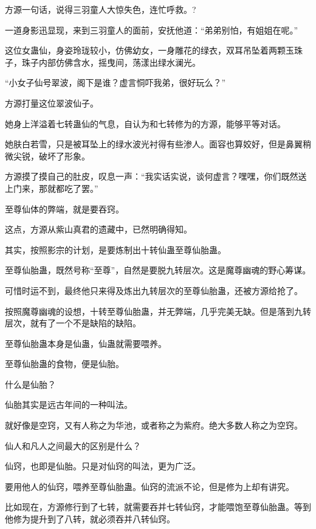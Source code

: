 
\begin{this_body}

方源一句话，说得三羽童人大惊失色，连忙呼救。?

一道身影迅显现，来到三羽童人的面前，安抚他道：“弟弟别怕，有姐姐在呢。”

这位女蛊仙，身姿玲珑较小，仿佛幼女，一身雕花的绿衣，双耳吊坠着两颗玉珠子，珠子内部仿佛含水，摇曳间，荡漾出绿水澜光。

“小女子仙号翠波，阁下是谁？虚言恫吓我弟，很好玩么？”

方源打量这位翠波仙子。

她身上洋溢着七转蛊仙的气息，自认为和七转修为的方源，能够平等对话。

她肤白若雪，只是被耳坠上的绿水波光衬得有些渗人。面容也算姣好，但是鼻翼稍微尖锐，破坏了形象。

方源摸了摸自己的肚皮，叹息一声：“我实话实说，谈何虚言？嘿嘿，你们既然送上门来，那就都吃了罢。”

至尊仙体的弊端，就是要吞窍。

这点，方源从紫山真君的遗藏中，已然明确得知。

其实，按照影宗的计划，是要炼制出十转仙蛊至尊仙胎蛊。

至尊仙胎蛊，既然号称“至尊”，自然是要脱九转层次。这是魔尊幽魂的野心筹谋。

可惜时运不到，最终他只来得及炼出九转层次的至尊仙胎蛊，还被方源给抢了。

按照魔尊幽魂的设想，十转至尊仙胎蛊，并无弊端，几乎完美无缺。但是落到九转层次，就有了一个不是缺陷的缺陷。

至尊仙胎蛊本身是仙蛊，仙蛊就需要喂养。

至尊仙胎蛊的食物，便是仙胎。

什么是仙胎？

仙胎其实是远古年间的一种叫法。

就好像是空窍，又有人称之为华池，或者称之为紫府。绝大多数人称之为空窍。

仙人和凡人之间最大的区别是什么？

仙窍，也即是仙胎。只是对仙窍的叫法，更为广泛。

要用他人的仙窍，喂养至尊仙胎蛊。仙窍的流派不论，但是修为上却有讲究。

比如现在，方源修行到了七转，就需要吞并七转仙窍，才能喂饱至尊仙胎蛊。等到他修为提升到了八转，就必须吞并八转仙窍。


\end{this_body}
